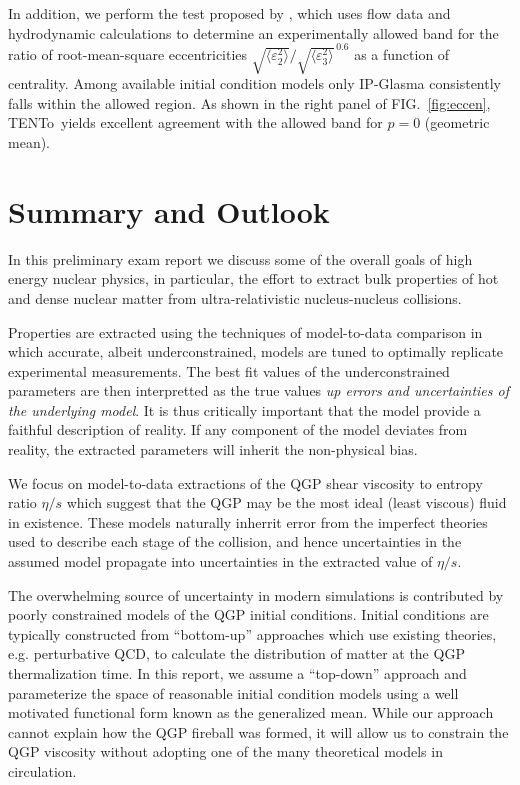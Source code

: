 \documentclass[aps,prc,reprint,amsmath,nofootinbib]{revtex4-1}
\newcommand{\trento}{T\raisebox{-.5ex}{R}ENTo}
\newcommand{\eccratio}{\sqrt{\langle \varepsilon_2^2 \rangle}/\sqrt{\langle \varepsilon_3^2 \rangle}^{\,0.6}}
\begin{document}
In addition, we perform the test proposed by \cite{Retinskaya:2014zea}, which uses flow data and hydrodynamic calculations to determine an experimentally allowed band for the ratio of root-mean-square eccentricities $\eccratio$ as a function of centrality.
Among available initial condition models only IP-Glasma consistently falls within the allowed region.
As shown in the right panel of FIG.~\ref{fig:eccen}, \trento\ yields excellent agreement with the allowed band for $p = 0$ (geometric mean).

\section{Summary and Outlook}

In this preliminary exam report we discuss some of the overall goals of high energy nuclear physics, in particular, the effort to extract bulk properties of hot and dense 
nuclear matter from ultra-relativistic nucleus-nucleus collisions. 

Properties are extracted using the techniques of model-to-data comparison in which accurate, albeit underconstrained, models are tuned to optimally replicate experimental 
measurements. The best fit values of the underconstrained parameters are then interpretted as the true values \emph{up errors and uncertainties of the underlying model}.
It is thus critically important that the model provide a faithful description of reality. If any component of the model deviates from reality, the extracted parameters will
inherit the non-physical bias.

We focus on model-to-data extractions of the QGP shear viscosity to entropy ratio $\eta/s$ which suggest that the QGP may be the most ideal (least viscous) fluid in existence.
These models naturally inherrit error from the imperfect theories used to describe each stage of the collision, and hence uncertainties in the assumed model propagate into uncertainties
in the extracted value of $\eta/s$.

The overwhelming source of uncertainty in modern simulations is contributed by poorly constrained models of the QGP initial conditions. Initial conditions are typically constructed from 
``bottom-up'' approaches which use existing theories, e.g. perturbative QCD, to calculate the distribution of matter at the QGP thermalization time. In this report, we 
assume a ``top-down'' approach and parameterize the space of reasonable initial condition models using a well motivated functional form known as the generalized mean. 
While our approach cannot explain how the QGP fireball was formed, it will allow us to constrain the QGP viscosity without adopting one of the many theoretical models in 
circulation.
\end{document}
